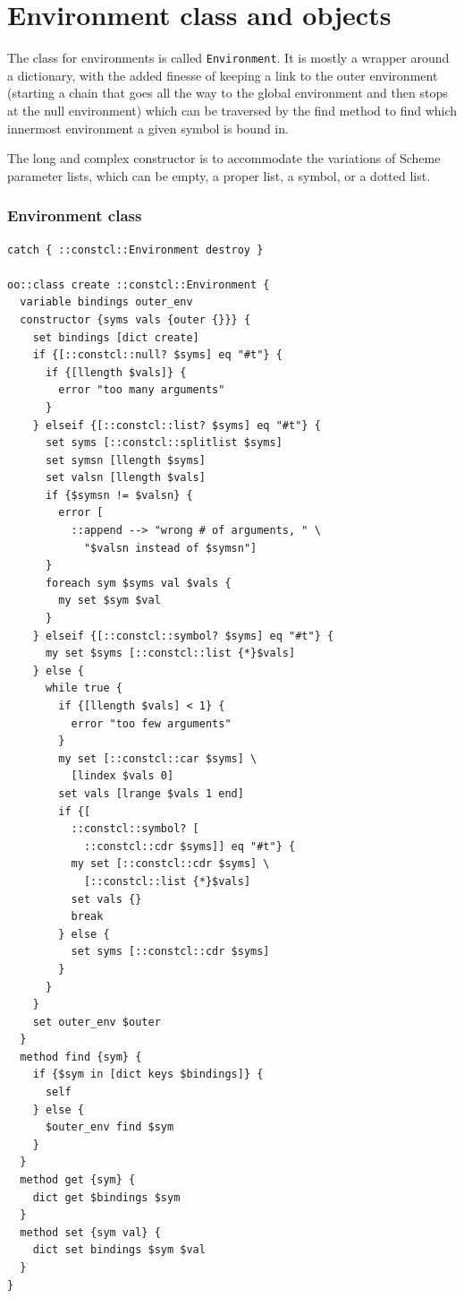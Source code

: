\documentclass[twoside,9pt]{report}
\begin{document}
\chapter{Environment class and objects}
\label{environment-class-and-objects}


The class for environments is called \texttt{Environment}. It is mostly a wrapper around a dictionary, with the added finesse of keeping a link to the outer environment (starting a chain that goes all the way to the global environment and then stops at the null environment) which can be traversed by the find method to find which innermost environment a given symbol is bound in.


The long and complex constructor is to accommodate the variations of Scheme parameter lists, which can be empty, a proper list, a symbol, or a dotted list.

\subsection{Environment class}
\label{environment-class}
\begin{lstlisting}
catch { ::constcl::Environment destroy }
 
oo::class create ::constcl::Environment {
  variable bindings outer_env
  constructor {syms vals {outer {}}} {
    set bindings [dict create]
    if {[::constcl::null? $syms] eq "#t"} {
      if {[llength $vals]} {
        error "too many arguments"
      }
    } elseif {[::constcl::list? $syms] eq "#t"} {
      set syms [::constcl::splitlist $syms]
      set symsn [llength $syms]
      set valsn [llength $vals]
      if {$symsn != $valsn} {
        error [
          ::append --> "wrong # of arguments, " \
            "$valsn instead of $symsn"]
      }
      foreach sym $syms val $vals {
        my set $sym $val
      }
    } elseif {[::constcl::symbol? $syms] eq "#t"} {
      my set $syms [::constcl::list {*}$vals]
    } else {
      while true {
        if {[llength $vals] < 1} {
          error "too few arguments"
        }
        my set [::constcl::car $syms] \
          [lindex $vals 0]
        set vals [lrange $vals 1 end]
        if {[
          ::constcl::symbol? [
            ::constcl::cdr $syms]] eq "#t"} {
          my set [::constcl::cdr $syms] \
            [::constcl::list {*}$vals]
          set vals {}
          break
        } else {
          set syms [::constcl::cdr $syms]
        }
      }
    }
    set outer_env $outer
  }
  method find {sym} {
    if {$sym in [dict keys $bindings]} {
      self
    } else {
      $outer_env find $sym
    }
  }
  method get {sym} {
    dict get $bindings $sym
  }
  method set {sym val} {
    dict set bindings $sym $val
  }
}
\end{lstlisting}
\end{document}

